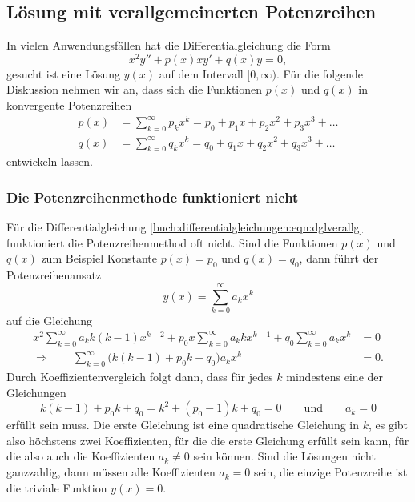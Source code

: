 %
%
\subsection{Lösung mit verallgemeinerten Potenzreihen
\label{buch:differentialgleichungen:subsection:verallgemeinrt}}
In vielen Anwendungsfällen hat die Differentialgleichung die Form
\begin{equation}
x^2y'' + p(x)xy' + q(x)y = 0,
\label{buch:differentialgleichungen:eqn:dglverallg}
\end{equation}
gesucht ist eine Lösung $y(x)$ auf dem Intervall $[0,\infty)$.
Für die folgende Diskussion nehmen wir an, dass sich die Funktionen
$p(x)$ und $q(x)$ in konvergente Potenzreihen
\begin{align*}
p(x)&=\sum_{k=0}^\infty p_kx^k = p_0+p_1x+p_2x^2+p_3x^3+\dots
\\
q(x)&=\sum_{k=0}^\infty q_kx^k = q_0+q_1x+q_2x^2+q_3x^3+\dots
\end{align*}
entwickeln lassen.

\subsubsection{Die Potenzreihenmethode funktioniert nicht}
Für die Differentialgleichung
\eqref{buch:differentialgleichungen:eqn:dglverallg}
funktioniert die Potenzreihenmethod oft nicht.
Sind die Funktionen $p(x)$ und $q(x)$ zum Beispiel Konstante 
$p(x)=p_0$ und $q(x)=q_0$, dann führt der Potenzreihenansatz
\[
y(x) = \sum_{k=0}^\infty a_kx^k
\]
auf die Gleichung
\begin{align*}
x^2\sum_{k=0}^\infty a_kk(k-1)x^{k-2}
+
p_0x\sum_{k=0}^\infty a_kkx^{k-1}
+
q_0\sum_{k=0}^\infty a_kx^k
&=
0
\\
\Rightarrow\qquad
\sum_{k=0}^\infty\bigl(
k(k-1)
+
p_0k
+
q_0
\bigr)a_kx^k
&=
0.
\end{align*}
Durch Koeffizientenvergleich folgt dann, dass für jedes $k$ mindestens
eine der Gleichungen
\[
k(k-1) +p_0k +q_0 = k^2 + (p_0-1)k +q_0 = 0
\qquad\text{und}\qquad
a_k=0
\]
erfüllt sein muss.
Die erste Gleichung ist eine quadratische Gleichung in $k$, es gibt also
höchstens zwei Koeffizienten, für die die erste Gleichung erfüllt sein
kann, für die also auch die Koeffizienten $a_k\ne 0$ sein können.
Sind die Lösungen nicht ganzzahlig, dann müssen alle Koeffizienten 
$a_k=0$ sein, die einzige Potenzreihe ist die triviale Funktion $y(x)=0$.

